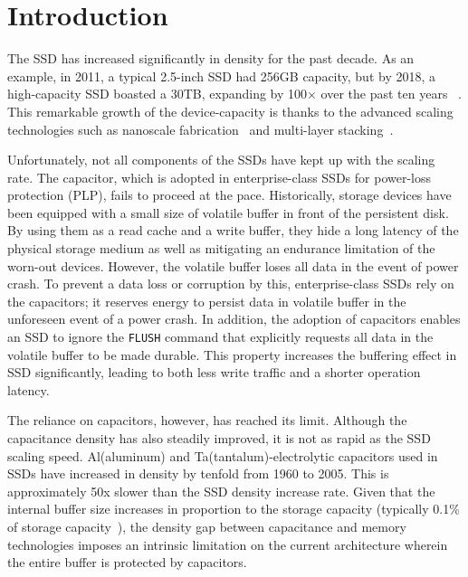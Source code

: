 \section{Introduction}

The SSD has increased significantly in density for the past decade. 
As an example, in 2011, a typical 2.5-inch SSD had 256GB capacity, but
by 2018, a high-capacity SSD boasted a 30TB, expanding by 100× over the past ten years
~\cite{samsung2011, anandtech18samsung}. 
This remarkable growth of the device-capacity is thanks to the advanced scaling technologies 
such as nanoscale fabrication~\cite{busche2014design} and multi-layer stacking~\cite{9365809}. 


Unfortunately, not all components of the SSDs have kept up with the scaling rate.
The capacitor, which is adopted in enterprise-class SSDs for power-loss protection (PLP), fails to proceed at the pace. Historically, storage devices 
have been equipped with a small size of volatile buffer in front of the persistent disk. 
By using them as a read cache and a write buffer, they hide a long latency of the physical storage medium 
as well as mitigating an endurance limitation of the worn-out devices. 
However, the volatile buffer loses all data in the event of power crash. 
To prevent a data loss or corruption by this, enterprise-class SSDs
rely on the capacitors; it reserves energy to persist data in volatile buffer 
in the unforeseen event of a power crash. 
In addition, the adoption of capacitors enables an SSD to ignore the \texttt{FLUSH} command that explicitly requests all data in the volatile buffer to be made durable.
This property increases the buffering effect in SSD significantly, leading to both less write traffic and a shorter operation latency.

The reliance on capacitors, however, has reached its limit. 
Although the capacitance density has also steadily improved, 
it is not as rapid as the SSD scaling speed. 
Al(aluminum) and Ta(tantalum)-electrolytic capacitors used in SSDs 
have increased in density by tenfold from 1960 to 2005. 
This is approximately 50x slower than the SSD density increase rate.
Given that the internal buffer size increases in proportion to the storage capacity (typically 0.1\% of storage capacity~\cite{samsung_ratio, ni2017hash}),
the density gap between capacitance and memory technologies 
imposes an intrinsic limitation on the current architecture wherein 
the entire buffer is protected by capacitors. 


